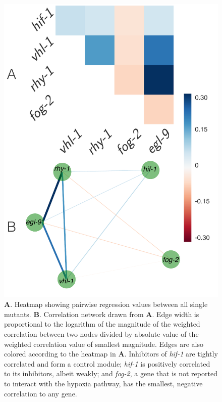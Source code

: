 \documentclass[9pt,twocolumn,twoside]{pnas-new}
\newcommand{\gene}[1]{\emph{#1}}
\begin{document}
\begin{figure}[tbhp]
\centering
\includegraphics[width=\linewidth]{figs/Bayesian_heat_map.pdf}
\caption{
\textbf{A}. Heatmap showing pairwise regression values between all
single mutants. \textbf{B}. Correlation network drawn from \textbf{A}. Edge
width is proportional to the logarithm of the magnitude of the weighted
correlation between two nodes divided by absolute value of the weighted
correlation value of smallest magnitude. Edges are also colored according to the
heatmap in \textbf{A}. Inhibitors of \gene{hif-1} are tightly correlated and form
a control module;
\gene{hif-1} is positively correlated to its inhibitors, albeit weakly;
and
\gene{fog-2}, a gene that is not reported to interact with the hypoxia pathway,
has the smallest, negative correlation to any gene.
}
\label{fig:heatmap}
\end{figure}
\end{document}
